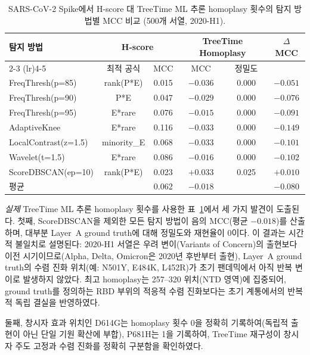 \begin{table}[htbp]
\centering
\caption{SARS-CoV-2 Spike에서 H-score 대 TreeTime ML 추론 homoplasy 횟수의 탐지 방법별 MCC 비교 (500개 서열, 2020-H1).}
\label{tab:phylo_sensitivity}
\small
\begin{tabular}{lccccc}
\toprule
탐지 방법 & \multicolumn{2}{c}{H-score} & \multicolumn{2}{c}{TreeTime Homoplasy} & $\Delta$MCC \\
\cmidrule(lr){2-3} \cmidrule(lr){4-5}
 & 최적 공식 & MCC & MCC & 정밀도 & \\
\midrule
FreqThresh(p=85)     & rank(P*E) & 0.015 & $-0.036$ & 0.000 & $-0.051$ \\
FreqThresh(p=90)     & P*E       & 0.047 & $-0.029$ & 0.000 & $-0.076$ \\
FreqThresh(p=95)     & E*rare    & 0.076 & $-0.015$ & 0.000 & $-0.091$ \\
AdaptiveKnee         & E*rare    & 0.116 & $-0.033$ & 0.000 & $-0.149$ \\
LocalContrast(z=1.5) & minority\_E & 0.068 & $-0.033$ & 0.000 & $-0.101$ \\
Wavelet(t=1.5)       & E*rare    & 0.086 & $-0.016$ & 0.000 & $-0.102$ \\
ScoreDBSCAN(ep=10)   & rank(P*E) & 0.023 & $+0.033$ & 0.025 & $+0.010$ \\
\midrule
평균                 &           & 0.062 & $-0.018$ &       & $-0.080$ \\
\bottomrule
\end{tabular}
\end{table}

\emph{실제} TreeTime ML 추론 homoplasy 횟수를 사용한 표~\ref{tab:phylo_sensitivity}에서 세 가지 발견이 도출된다.
첫째, ScoreDBSCAN을 제외한 모든 탐지 방법이 음의 MCC(평균 $-0.018$)를 산출하며, 대부분 Layer~A ground truth에 대해 정밀도와 재현율이 0이다.
이 결과는 시간적 불일치로 설명된다: 2020-H1 서열은 우려 변이(Variants of Concern)의 출현보다 이전 시기이므로(Alpha, Delta, Omicron은 2020년 후반부터 출현), Layer~A ground truth의 수렴 진화 위치(예: N501Y, E484K, L452R)가 초기 팬데믹에서 아직 반복 변이로 발생하지 않았다.
최고 homoplasy는 257--320 위치(NTD 영역)에 집중되어, ground truth를 정의하는 RBD 부위의 적응적 수렴 진화보다는 초기 계통에서의 반복적 독립 결실을 반영하였다.

둘째, 창시자 효과 위치인 D614G는 homoplasy 횟수 0을 정확히 기록하여(독립적 출현이 아닌 단일 기원 확산에 부합), P681H는 1을 기록하여, TreeTime 재구성이 창시자 주도 고정과 수렴 진화를 정확히 구분함을 확인하였다.

